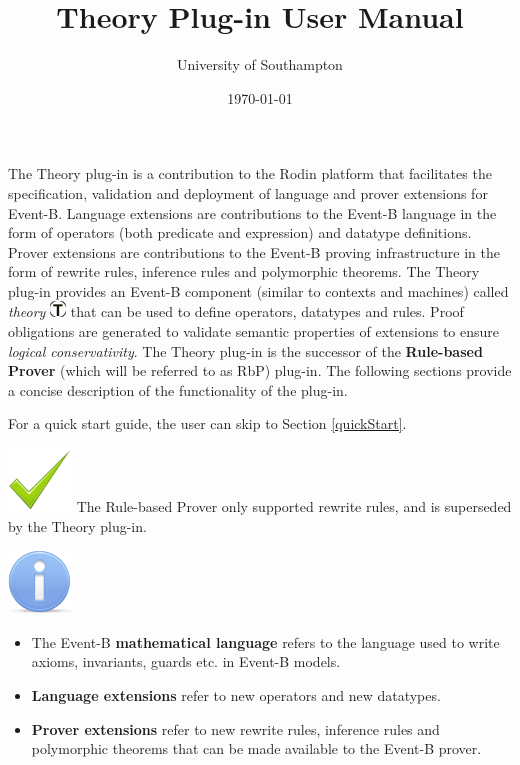 \documentclass{article}      %
\title{Theory Plug-in User Manual}  %
\author{University of Southampton}      %
\date{\today}
\begin{document}

\maketitle
The Theory plug-in is a contribution to the Rodin platform that facilitates the specification, validation and deployment of language and prover extensions for Event-B. Language extensions are contributions to the Event-B language in the form of operators (both predicate and expression) and datatype definitions. Prover extensions are contributions to the Event-B proving infrastructure in the form of rewrite rules, inference rules and polymorphic theorems. The Theory plug-in provides an Event-B component (similar to contexts and machines) called 
\textit{theory} \includegraphics{images/thy.png} that can be used to define operators, datatypes and rules. Proof obligations are generated to validate semantic properties of extensions to ensure \textit{logical conservativity}. The Theory plug-in is the successor of the \textbf{Rule-based Prover} (which will be referred to as RbP) plug-in. The following sections provide a concise description of the functionality of the plug-in. 
\par
For a quick start guide, the user can skip to Section \ref{quickStart}.

\includegraphics{images/nike.png} The Rule-based Prover only supported rewrite rules, and is superseded  by the Theory plug-in.

\includegraphics{images/info.png} 
\begin{itemize}
	\item The Event-B \textbf{mathematical language} refers to the language used to write axioms, invariants, guards etc. in Event-B models.
	\item \textbf{Language extensions} refer to new operators and new datatypes.
	\item \textbf{Prover extensions} refer to new rewrite rules, inference rules and polymorphic theorems that can be made available to the Event-B prover.
\end{itemize}
\end{document}

